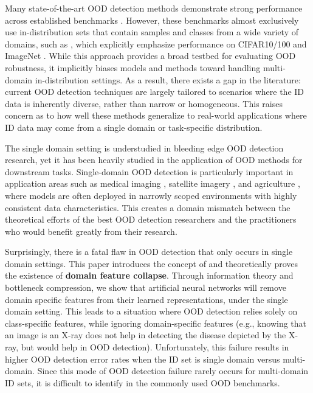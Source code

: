\documentclass[letterpaper]{article} %
\theoremstyle{plain}
\theoremstyle{definition}
\theoremstyle{remark}
\begin{document}
Many state-of-the-art OOD detection methods demonstrate strong performance across established benchmarks \citep{zhang2023openood}. However, these benchmarks almost exclusively use in-distribution sets that contain samples and classes from a wide variety of domains, such as \citep{zhang2023openood}, which explicitly emphasize performance on CIFAR10/100 \citep{cifar10} and ImageNet \citep{deng2009imagenet}. While this approach provides a broad testbed for evaluating OOD robustness, it implicitly biases models and methods toward handling multi-domain in-distribution settings. As a result, there exists a gap in the literature: current OOD detection techniques are largely tailored to scenarios where the ID data is inherently diverse, rather than narrow or homogeneous. This raises concern as to how well these methods generalize to real-world applications where ID data may come from a single domain or task-specific distribution.

The single domain setting is understudied in bleeding edge OOD detection research, yet it has been heavily studied in the application of OOD methods for downstream tasks. Single-domain OOD detection is particularly important in application areas such as medical imaging \citep{zhang2021out}, satellite imagery \citep{ekim2024distribution}, and agriculture \citep{saadati2024out}, where models are often deployed in narrowly scoped environments with highly consistent data characteristics. This creates a domain mismatch between the theoretical efforts of the best OOD detection researchers and the practitioners who would benefit greatly from their research. 

Surprisingly, there is a fatal flaw in OOD detection that only occurs in single domain settings. This paper introduces the concept of and theoretically proves the existence of \textbf{domain feature collapse}. Through information theory and bottleneck compression, we show that artificial neural networks will remove domain specific features from their learned representations, under the single domain setting. This leads to a situation where OOD detection relies solely on class-specific features, while ignoring domain-specific features (e.g., knowing that an image is an X-ray does not help in detecting the disease depicted by the X-ray, but would help in OOD detection). Unfortunately, this failure results in higher OOD detection error rates when the ID set is single domain versus multi-domain. Since this mode of OOD detection failure rarely occurs for multi-domain ID sets, it is difficult to identify in the commonly used OOD benchmarks. 
\end{document}

